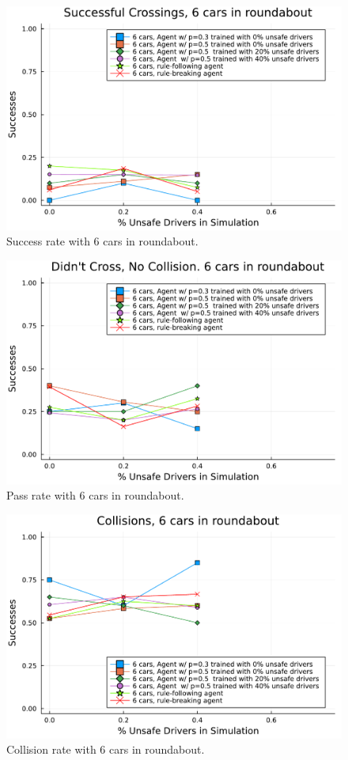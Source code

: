 \documentclass[conference]{IEEEtran}
\begin{document}
\begin{figure}[h]
	\centering
	\includegraphics[width=0.9\linewidth]{figures/successes.pdf}
	\caption{Success rate with 6 cars in roundabout.}
	\label{fig:success_6cars}
\end{figure}
\begin{figure}[h]
	\centering
	\includegraphics[width=0.9\linewidth]{figures/passes.pdf}
	\caption{Pass rate with 6 cars in roundabout.}
	\label{fig:passes_6cars}
\end{figure}
\begin{figure}[h]
	\centering
	\includegraphics[width=0.9\linewidth]{figures/collisions.pdf}
	\caption{Collision rate with 6 cars in roundabout.}
	\label{fig:collisions_6cars}
\end{figure}
\end{document}

